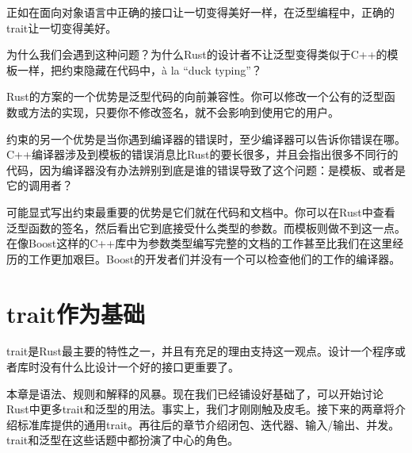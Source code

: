 正如在面向对象语言中正确的接口让一切变得美好一样，在泛型编程中，正确的trait让一切变得美好。

为什么我们会遇到这种问题？为什么Rust的设计者不让泛型变得类似于C++的模板一样，把约束隐藏在代码中，à la “duck typing”？

Rust的方案的一个优势是泛型代码的向前兼容性。你可以修改一个公有的泛型函数或方法的实现，只要你不修改签名，就不会影响到使用它的用户。

约束的另一个优势是当你遇到编译器的错误时，至少编译器可以告诉你错误在哪。C++编译器涉及到模板的错误消息比Rust的要长很多，并且会指出很多不同行的代码，因为编译器没有办法辨别到底是谁的错误导致了这个问题：是模板、或者是它的调用者？

可能显式写出约束最重要的优势是它们就在代码和文档中。你可以在Rust中查看泛型函数的签名，然后看出它到底接受什么类型的参数。而模板则做不到这一点。在像Boost这样的C++库中为参数类型编写完整的文档的工作甚至比我们在这里经历的工作更加艰巨。Boost的开发者们并没有一个可以检查他们的工作的编译器。

\section{trait作为基础}

trait是Rust最主要的特性之一，并且有充足的理由支持这一观点。设计一个程序或者库时没有什么比设计一个好的接口更重要了。

本章是语法、规则和解释的风暴。现在我们已经铺设好基础了，可以开始讨论Rust中更多trait和泛型的用法。事实上，我们才刚刚触及皮毛。接下来的两章将介绍标准库提供的通用trait。再往后的章节介绍闭包、迭代器、输入/输出、并发。trait和泛型在这些话题中都扮演了中心的角色。
